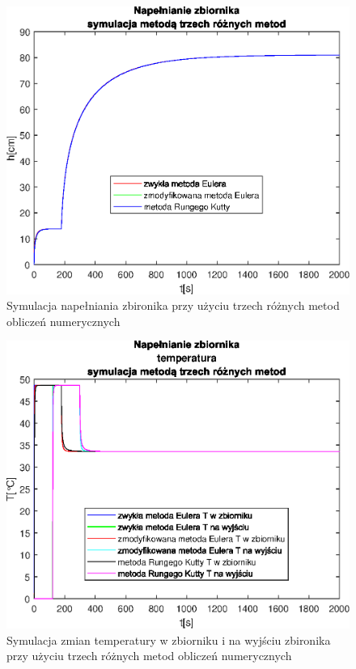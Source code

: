 \begin{figure}[h!]
   \centering
   \includegraphics{img/object-simulation/method-comparison-volume.eps}
   \caption{Symulacja napełniania zbironika przy użyciu trzech różnych metod obliczeń numerycznych}
   \label{fig:method-comparison-volume}
\end{figure}
            
\begin{figure}[h!]
   \centering
   \includegraphics{img/object-simulation/method-comparison-temperature.eps}
   \caption{Symulacja zmian temperatury w zbiorniku i na wyjściu zbironika przy użyciu trzech różnych metod obliczeń numerycznych}
   \label{fig:method-comparison-volume}
\end{figure}
            

